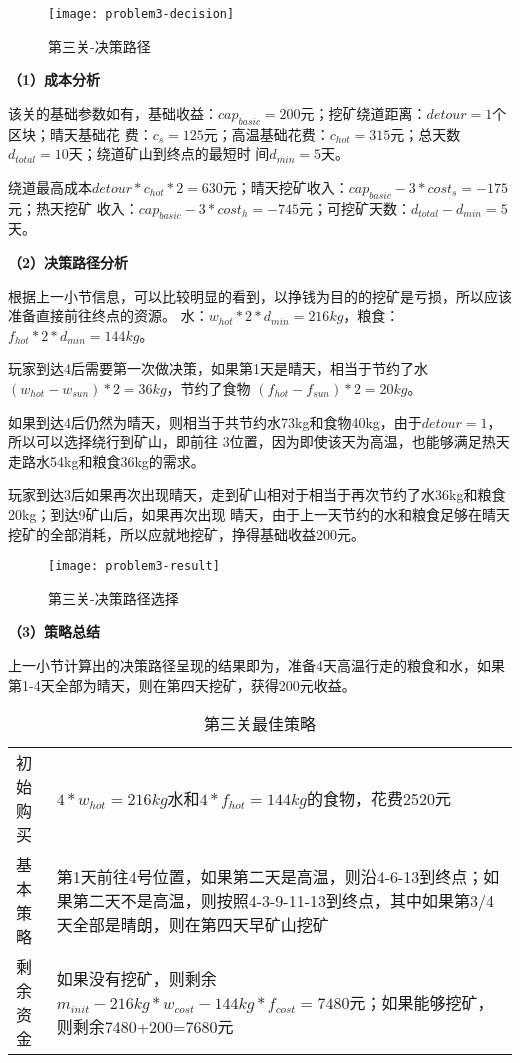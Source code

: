 \documentclass[bwprint]{cumcmthesis} %
\begin{document}
\begin{figure}[!h]
    \centering
    \texttt{[image: problem3-decision]}
    \caption{第三关-决策路径}
    \label{fig:problem3-decision}
\end{figure}

\textbf{（1）成本分析}

该关的基础参数如有，基础收益：$cap_{basic} = 200$元；挖矿绕道距离：$detour = 1$个区块；晴天基础花
费：$c_s=125$元；高温基础花费：$c_{hot}=315$元；总天数$d_{total}=10$天；绕道矿山到终点的最短时
间$d_{min}=5$天。

绕道最高成本$detour*c_{hot}*2=630$元；晴天挖矿收入：$cap_{basic}-3*cost_s=-175$元；热天挖矿
收入：$cap_{basic}-3*cost_h=-745$元；可挖矿天数：$d_{total}-d_{min}=5$天。

\textbf{（2）决策路径分析}

根据上一小节信息，可以比较明显的看到，以挣钱为目的的挖矿是亏损，所以应该准备直接前往终点的资源。
水：$w_{hot}*2*d_{min}=216kg$，粮食：$f_{hot}*2*d_{min}=144kg$。

玩家到达4后需要第一次做决策，如果第1天是晴天，相当于节约了水$(w_{hot}-w_{sun})*2=36kg$，节约了食物
$(f_{hot}-f_{sun})*2=20kg$。

如果到达4后仍然为晴天，则相当于共节约水73kg和食物40kg，由于$detour=1$，所以可以选择绕行到矿山，即前往
3位置，因为即使该天为高温，也能够满足热天走路水54kg和粮食36kg的需求。

玩家到达3后如果再次出现晴天，走到矿山相对于相当于再次节约了水36kg和粮食20kg；到达9矿山后，如果再次出现
晴天，由于上一天节约的水和粮食足够在晴天挖矿的全部消耗，所以应就地挖矿，挣得基础收益200元。

\begin{figure}[!h]
    \centering
    \texttt{[image: problem3-result]}
    \caption{第三关-决策路径选择}
    \label{fig:problem3-result}
\end{figure}

\textbf{（3）策略总结}

上一小节计算出的决策路径呈现的结果即为，准备4天高温行走的粮食和水，如果第1-4天全部为晴天，则在第四天挖矿，获得200元收益。

\begin{table}[!htbp]
    \caption{第三关最佳策略}\label{tab:strategy} \centering
    \begin{tabular}{p{2cm}p{13cm}}
        \midrule[1pt]
        初始购买 & $4*w_{hot}=216kg$水和$4*f_{hot}=144kg$的食物，花费2520元 \\
        基本策略 & 第1天前往4号位置，如果第二天是高温，则沿4-6-13到终点；如果第二天不是高温，则按照4-3-9-11-13到终点，其中如果第3/4天全部是晴朗，则在第四天早矿山挖矿 \\
        剩余资金 & 如果没有挖矿，则剩余$m_{init}-216kg*w_{cost}-144kg*f_{cost}=7480$元；如果能够挖矿，则剩余7480+200=7680元 \\
        \bottomrule[1pt]
    \end{tabular}
\end{table}
\end{document}
